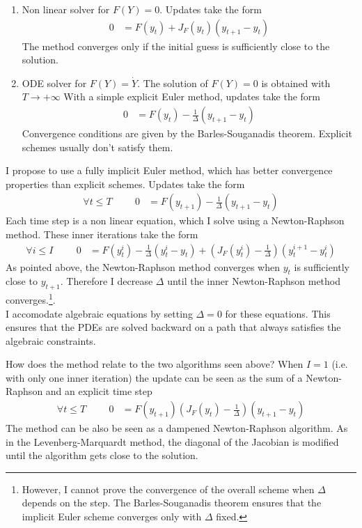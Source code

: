 \documentclass[english]{article}
\begin{document}
\begin{enumerate}
	\item Non linear solver for $F (Y ) = 0$. Updates take the form
	\begin{align*}
		0 &= F(y_{t}) + J_{F}(y_t) (y_{t+1} - y_t)
	\end{align*}
	The method converges only if the initial guess is sufficiently close to the solution. 
	\item ODE solver for $F(Y) = \dot{Y}$. The solution of $F(Y)=0$ is obtained with $T\rightarrow +\infty$
	With a simple explicit Euler method, updates take the form
	\begin{align*}
		0&= F(y_t) - \frac{1}{\Delta} (y_{t+1} -y_{t})
	\end{align*}
	Convergence conditions are given by the Barles-Souganadis theorem. Explicit schemes usually don't satisfy them.
\end{enumerate}
I propose to use a fully implicit Euler method, which has better convergence properties than explicit schemes.  Updates take the form 
\begin{align*}
	\forall t \leq T \hspace{1cm} 0&= F(y_{t+1}) - \frac{1}{\Delta}(y_{t+1} -y_{t})
\end{align*}
Each time step is a non linear equation, which I solve using a Newton-Raphson method. These inner iterations take the form
\begin{align*}
	\forall i \leq I \hspace{1cm}	0 &= F(y_{t}^i) - \frac{1}{\Delta}(y_{t}^{i} -y_{t}) + (J_{F}(y_t^i) -  \frac{1}{\Delta})(y^{i+1}_{t} - y_t^i)
\end{align*}
As pointed above, the Newton-Raphson method converges when $y_t$ is sufficiently close to $y_{t+1}$. Therefore I decrease $\Delta$ until the inner Newton-Raphson method converges.\footnote{However, I cannot prove the convergence of the overall scheme when $\Delta$ depends on the step. The Barles-Souganadis theorem ensures that the implicit Euler scheme converges only with $\Delta$ fixed. }.\\
I accomodate algebraic equations by setting $\Delta = 0$ for these equations. This ensures that the PDEs are solved backward on a path that always satisfies the algebraic constraints.

How does the method relate to the two algorithms seen above? When $I =1$ (i.e. with only one inner iteration) the update can be seen as the sum of a Newton-Raphson and an explicit time step
\begin{align*}
	\forall t \leq T \hspace{1cm} 0&= F(y_{t+1}) (J_{F}(y_t) - \frac{1}{\Delta})(y_{t+1} -y_{t})
\end{align*}
The method can be also be seen as a dampened Newton-Raphson algorithm. As in the Levenberg-Marquardt method, the diagonal of the Jacobian is modified until the algorithm gets close to the solution.
\end{document}
